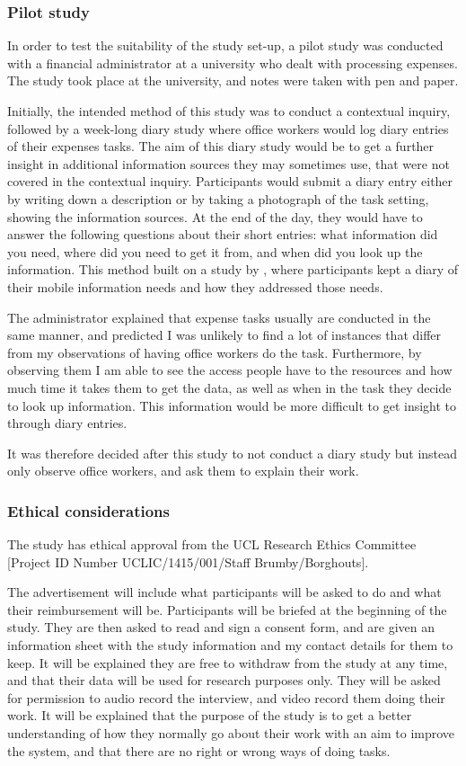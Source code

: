 \documentclass[11pt,oneside]{report}
\begin{document}
\subsubsection{Pilot study}
In order to test the suitability of the study set-up, a pilot study was conducted with a financial administrator at a university who dealt with processing expenses. The study took place at the university, and notes were taken with pen and paper. 

Initially, the intended method of this study was to conduct a contextual inquiry, followed by a week-long diary study where office workers would log diary entries of their expenses tasks. The aim of this diary study would be to get a further insight in additional information sources they may sometimes use, that were not covered in the contextual inquiry.  Participants would submit a diary entry either by writing down a description or by taking a photograph of the task setting, showing the information sources. At the end of the day, they would have to answer the following questions about their short entries: what information did you need, where did you need to get it from, and when did you look up the information. This method built on a study by \citet{Sohn2008}, where participants kept a diary of their mobile information needs and how they addressed those needs. 

The administrator explained that expense tasks usually are conducted in the same manner, and predicted I was unlikely to find a lot of instances that differ from my observations of having office workers do the task.
Furthermore, by observing them I am able to see the access people have to the resources and how much time it takes them to get the data, as well as when in the task they decide to look up information. This information would be more difficult to get insight to through diary entries.

It was therefore decided after this study to not conduct a diary study but instead only observe office workers, and ask them to explain their work.

\subsubsection{Ethical considerations}
The study has ethical approval from the UCL Research Ethics Committee [Project ID Number UCLIC/1415/001/Staff Brumby/Borghouts]. 

The advertisement will include what participants will be asked to do and what their reimbursement will be. 
Participants will be briefed at the beginning of the study. They are then asked to read and sign a consent form, and are given an information sheet with the study information and my contact details for them to keep. 
It will be explained they are free to withdraw from the study at any time, and that their data will be used for research purposes only. They will be asked for permission to audio record the interview, and video record them doing their work. It will be explained that the purpose of the study is to get a better understanding of how they normally go about their work with an aim to improve the system, and that there are no right or wrong ways of doing tasks. 
\end{document}
